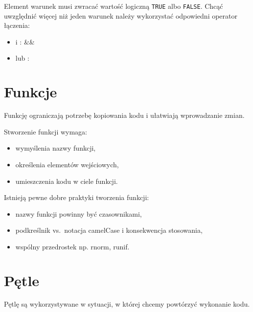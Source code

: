 \documentclass[
]{book}
\providecommand{\tightlist}{%
  \setlength{\itemsep}{0pt}\setlength{\parskip}{0pt}}
\begin{document}
Element warunek musi zwracać wartość logiczną \texttt{TRUE} albo \texttt{FALSE}. Chcąć uwzględnić więcej niż jeden warunek należy wykorzystać odpowiedni operator łączenia:

\begin{itemize}
\tightlist
\item
  i : \&\&
\item
  lub : \textbar\textbar{}
\end{itemize}

\hypertarget{funkcje}{%
\section{Funkcje}\label{funkcje}}

Funkcję ograniczają potrzebę kopiowania kodu i ułatwiają wprowadzanie zmian.

Stworzenie funkcji wymaga:

\begin{itemize}
\tightlist
\item
  wymyślenia nazwy funkcji,
\item
  określenia elementów wejściowych,
\item
  umieszczenia kodu w ciele funkcji.
\end{itemize}

Istnieją pewne dobre praktyki tworzenia funkcji:

\begin{itemize}
\tightlist
\item
  nazwy funkcji powinny być czasownikami,
\item
  podkreślnik vs.~notacja camelCase i konsekwencja stosowania,
\item
  wspólny przedrostek np. rnorm, runif.
\end{itemize}

\hypertarget{pux119tle}{%
\section{Pętle}\label{pux119tle}}

Pętlę są wykorzystywane w sytuacji, w której chcemy powtórzyć wykonanie kodu.
\end{document}
